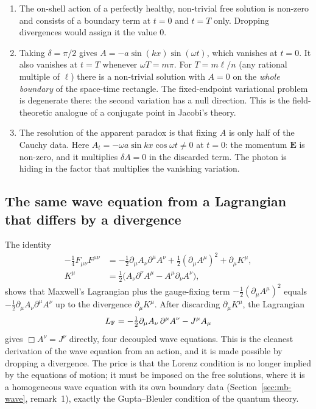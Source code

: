 \begin{enumerate}
\item The on-shell action of a perfectly healthy, non-trivial free
solution is non-zero and consists of a boundary term at $t=0$ and $t=T$
only. Dropping divergences would assign it the value $0$.
\item Taking $\delta=\pi/2$ gives $A=-a\sin(kx)\sin(\omega t)$, which
vanishes at $t=0$. It also vanishes at $t=T$ whenever $\omega T=m\pi$. For
$T=m\ell/n$ (any rational multiple of $\ell$) there is a non-trivial
solution with $A=0$ on the \emph{whole boundary} of the space-time
rectangle. The fixed-endpoint variational problem is degenerate there: the
second variation has a null direction. This is the field-theoretic analogue
of a conjugate point in Jacobi's theory.
\item The resolution of the apparent paradox is that fixing $A$ is only
half of the Cauchy data. Here $A_t=-\omega a\sin kx\cos\omega t\neq0$ at
$t=0$: the momentum $\mathbf E$ is non-zero, and it multiplies
$\delta A=0$ in the discarded term. The photon is hiding in the factor that
multiplies the vanishing variation.
\end{enumerate}

\subsection[Wave equation from a shifted Lagrangian]{The same wave equation from a Lagrangian that differs by a divergence}

The identity
\begin{equation}
\begin{split}
-\tfrac14F_{\mu\nu}F^{\mu\nu}
&=-\tfrac12\partial_\mu A_\nu\partial^\mu A^\nu+\tfrac12(\partial_\mu A^\mu)^2
+\partial_\mu K^\mu,\\
K^\mu&=\tfrac12\big(A_\nu\partial^\nu A^\mu-A^\mu\partial_\nu A^\nu\big),
\end{split}
\label{eq:mb-feynman}
\end{equation}
shows that Maxwell's Lagrangian plus the gauge-fixing term
$-\tfrac12(\partial_\mu A^\mu)^2$ equals $-\tfrac12\partial_\mu
A_\nu\partial^\mu A^\nu$ up to the divergence $\partial_\mu K^\mu$. After
discarding $\partial_\mu K^\mu$, the Lagrangian
\begin{equation}
L_{\rm F}=-\tfrac12\partial_\mu A_\nu\,\partial^\mu A^\nu-J^\mu A_\mu
\end{equation}
gives $\Box A^\nu=J^\nu$ directly, four decoupled wave equations. This is
the cleanest derivation of the wave equation from an action, and it is made
possible by dropping a divergence. The price is that the Lorenz condition
is no longer implied by the equations of motion; it must be imposed on the
free solutions, where it is a homogeneous wave equation with its own
boundary data (Section~\ref{sec:mb-wave}, remark~1), exactly the
Gupta--Bleuler condition of the quantum theory.

